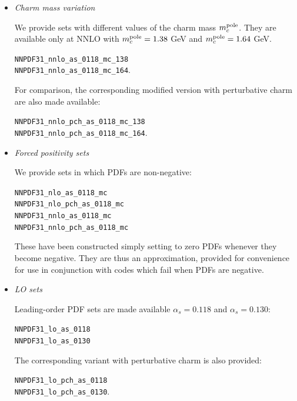 \begin{itemize}
\item {\it Charm mass variation}


We  provide sets with different values of the
  charm mass $m_c^{\rm pole}$.
  They are available only at NNLO
with $m_c^{\rm pole}=1.38$ GeV and $m_c^{\rm pole}=1.64$ GeV. 
  \begin{flushleft}
    {\tt NNPDF31\_nnlo\_as\_0118\_mc\_138}\\
    {\tt NNPDF31\_nnlo\_as\_0118\_mc\_164}.\\
\end{flushleft}
For
comparison, the corresponding modified version with perturbative
charm are also made available:
  \begin{flushleft}
     {\tt NNPDF31\_nnlo\_pch\_as\_0118\_mc\_138}\\
    {\tt NNPDF31\_nnlo\_pch\_as\_0118\_mc\_164}.\\
\end{flushleft}


\item {\it Forced positivity sets}

We provide sets in which PDFs are non-negative:
  \begin{flushleft}
    {\tt NNPDF31\_nlo\_as\_0118\_mc}\\
     {\tt NNPDF31\_nlo\_pch\_as\_0118\_mc}\\
    {\tt NNPDF31\_nnlo\_as\_0118\_mc}\\
     {\tt NNPDF31\_nnlo\_pch\_as\_0118\_mc}\\
\end{flushleft}
These have been constructed simply setting to zero PDFs whenever they
become negative. They are thus an approximation, provided for
convenience for use in conjunction with codes which fail when PDFs are
negative.

\item {\it LO sets} 

Leading-order PDF sets are made available 
 $\alpha_s = 0.118$ and  $\alpha_s = 0.130$: 
  \begin{flushleft}
    {\tt NNPDF31\_lo\_as\_0118}\\
    {\tt NNPDF31\_lo\_as\_0130}\\
\end{flushleft}
The corresponding variant with perturbative charm is also provided:
  \begin{flushleft}
    {\tt NNPDF31\_lo\_pch\_as\_0118}\\
    {\tt NNPDF31\_lo\_pch\_as\_0130}.
\end{flushleft}



\end{itemize}
